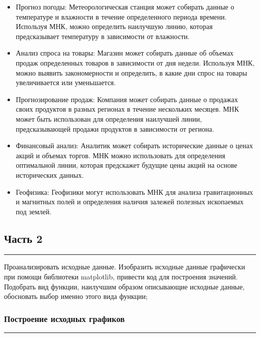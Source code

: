 \documentclass[a4paper, 14pt]{extarticle}
\begin{document}
\begin{itemize}
    \item Прогноз погоды: Метеорологическая станция может собирать данные о температуре и влажности в течение определенного периода времени. Используя МНК, можно определить наилучшую линию, которая предсказывает температуру в зависимости от влажности.
    \item Анализ спроса на товары: Магазин может собирать данные об объемах продаж определенных товаров в зависимости от дня недели. Используя МНК, можно выявить закономерности и определить, в какие дни спрос на товары увеличивается или уменьшается.
    \item Прогнозирование продаж: Компания может собирать данные о продажах своих продуктов в разных регионах в течение нескольких месяцев. МНК может быть использован для определения наилучшей линии, предсказывающей продажи продуктов в зависимости от региона.
    \item Финансовый анализ: Аналитик может собирать исторические данные о ценах акций и объемах торгов. МНК можно использовать для определения оптимальной линии, которая предскажет будущие цены акций на основе исторических данных.
    \item Геофизика: Геофизики могут использовать МНК для анализа гравитационных и магнитных полей и определения наличия залежей полезных ископаемых под землей.
\end{itemize}

\newpage

\subsection*{{Часть 2}}\vspace{-20pt}\rule{\linewidth}{0.1mm}

Проанализировать исходные данные. Изобразить исходные данные графически при помощи 
библиотеки matplotlib, привести код для построения значений. Подобрать вид функции, 
наилучшим образом описывающие исходные данные, обосновать выбор именно этого вида функции; \\

\subsubsection*{{Построение исходных графиков}}\vspace{-20pt}\rule{\linewidth}{0.1mm}
\end{document}
